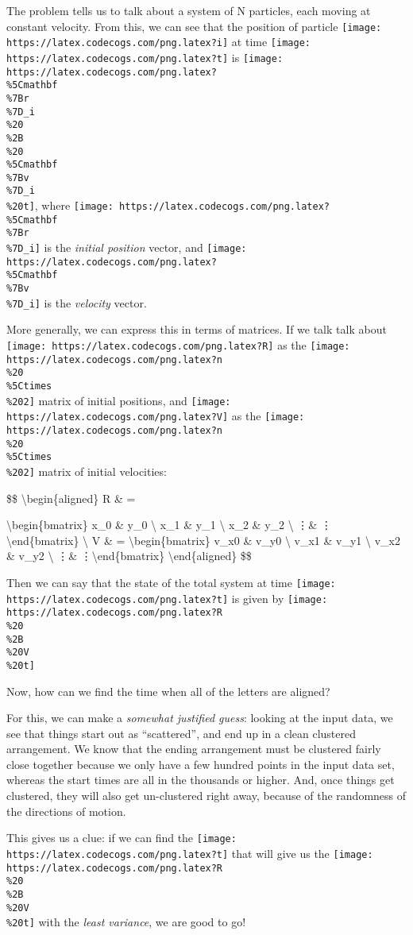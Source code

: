 \documentclass[]{article}
\begin{document}
The problem tells us to talk about a system of N particles, each moving at
constant velocity. From this, we can see that the position of particle
\texttt{[image: https://latex.codecogs.com/png.latex?i]} at time
\texttt{[image: https://latex.codecogs.com/png.latex?t]} is
\texttt{[image: https://latex.codecogs.com/png.latex?\\\%5Cmathbf\\\%7Br\\\%7D\_i\\\%20\\\%2B\\\%20\\\%5Cmathbf\\\%7Bv\\\%7D\_i\\\%20t]},
where
\texttt{[image: https://latex.codecogs.com/png.latex?\\\%5Cmathbf\\\%7Br\\\%7D\_i]} is
the \emph{initial position} vector, and
\texttt{[image: https://latex.codecogs.com/png.latex?\\\%5Cmathbf\\\%7Bv\\\%7D\_i]} is
the \emph{velocity} vector.

More generally, we can express this in terms of matrices. If we talk talk about
\texttt{[image: https://latex.codecogs.com/png.latex?R]} as the
\texttt{[image: https://latex.codecogs.com/png.latex?n\\\%20\\\%5Ctimes\\\%202]}
matrix of initial positions, and
\texttt{[image: https://latex.codecogs.com/png.latex?V]} as the
\texttt{[image: https://latex.codecogs.com/png.latex?n\\\%20\\\%5Ctimes\\\%202]}
matrix of initial velocities:

\$\$ \textbackslash{}begin\{aligned\} R \& =

\textbackslash{}begin\{bmatrix\} x\_0 \& y\_0 \textbackslash{} x\_1 \& y\_1
\textbackslash{} x\_2 \& y\_2 \textbackslash{} \vdots \& \vdots
\textbackslash{}end\{bmatrix\} \textbackslash{} V \& =
\textbackslash{}begin\{bmatrix\} v\_x0 \& v\_y0 \textbackslash{} v\_x1 \& v\_y1
\textbackslash{} v\_x2 \& v\_y2 \textbackslash{} \vdots \&
\vdots \textbackslash{}end\{bmatrix\} \textbackslash{}end\{aligned\} \$\$

Then we can say that the state of the total system at time
\texttt{[image: https://latex.codecogs.com/png.latex?t]} is given by
\texttt{[image: https://latex.codecogs.com/png.latex?R\\\%20\\\%2B\\\%20V\\\%20t]}

Now, how can we find the time when all of the letters are aligned?

For this, we can make a \emph{somewhat justified guess}: looking at the input
data, we see that things start out as ``scattered'', and end up in a clean
clustered arrangement. We know that the ending arrangement must be clustered
fairly close together because we only have a few hundred points in the input
data set, whereas the start times are all in the thousands or higher. And, once
things get clustered, they will also get un-clustered right away, because of the
randomness of the directions of motion.

This gives us a clue: if we can find the
\texttt{[image: https://latex.codecogs.com/png.latex?t]} that will give us the
\texttt{[image: https://latex.codecogs.com/png.latex?R\\\%20\\\%2B\\\%20V\\\%20t]} with
the \emph{least variance}, we are good to go!
\end{document}
